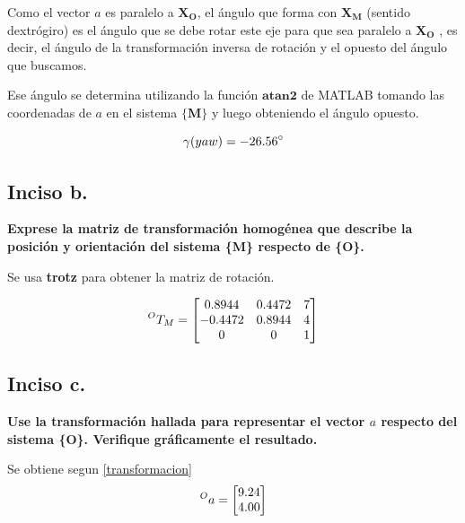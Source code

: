 \documentclass[a4paper,12pt]{article}
\begin{document}
Como el vector $a$ es paralelo a $\mathbf{X_O}$, 
el ángulo que forma con $\mathbf{X_M}$ (sentido dextrógiro)
es el ángulo que se debe rotar este eje para que sea paralelo a $\mathbf{X_O}$
, es decir, el ángulo de la transformación inversa de rotación y el opuesto del 
ángulo que buscamos.

Ese ángulo se determina utilizando la función $\mathbf{atan2}$ de MATLAB tomando las coordenadas
de $a$ en el sistema $\mathbf{\{M\}}$ y luego obteniendo el ángulo opuesto.

\[
    \gamma \text(yaw) = -26.56^\circ
\]

\subsection{Inciso b.}
\textbf{Exprese la matriz de transformación homogénea que describe la posición y orientación
del sistema \{M\} respecto de \{O\}.}
\vspace{0.5 cm}

Se usa \textbf{trotz} para obtener la matriz de rotación.

\begin{equation*}
    \prescript{O}{}{T_M} = 
    \begin{bmatrix}
        0.8944  & 0.4472       & 7 \\
        -0.4472 & 0.8944       & 4 \\
        0       & 0            & 1
    \end{bmatrix}
\end{equation*}

\subsection{Inciso c.}
\textbf{Use la transformación hallada para representar el vector $a$ respecto del sistema \{O\}.
Verifique gráficamente el resultado.}
\vspace{0.5 cm}

Se obtiene segun \cref{transformacion}
\[
    \prescript{O}{}{a} =
    \begin{bmatrix}
        9.24\\
        4.00
    \end{bmatrix}
\]
\end{document}
